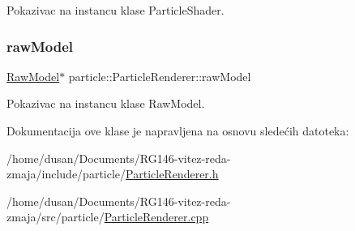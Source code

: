 Pokazivac na instancu klase Particle\+Shader. 

\mbox{\label{classparticle_1_1ParticleRenderer_a75765f5960127cf6ea74e2c3afaeff13}} 
\subsubsection{\texorpdfstring{raw\+Model}{rawModel}}
{\footnotesize\ttfamily \hyperlink{classmodel_1_1RawModel}{Raw\+Model}$\ast$ particle\+::\+Particle\+Renderer\+::raw\+Model\hspace{0.3cm}{\ttfamily [private]}}



Pokazivac na instancu klase Raw\+Model. 



Dokumentacija ove klase je napravljena na osnovu sledećih datoteka\+:\begin{DoxyCompactItemize}
\item 
/home/dusan/\+Documents/\+R\+G146-\/vitez-\/reda-\/zmaja/include/particle/\hyperlink{ParticleRenderer_8h}{Particle\+Renderer.\+h}\item 
/home/dusan/\+Documents/\+R\+G146-\/vitez-\/reda-\/zmaja/src/particle/\hyperlink{ParticleRenderer_8cpp}{Particle\+Renderer.\+cpp}\end{DoxyCompactItemize}
